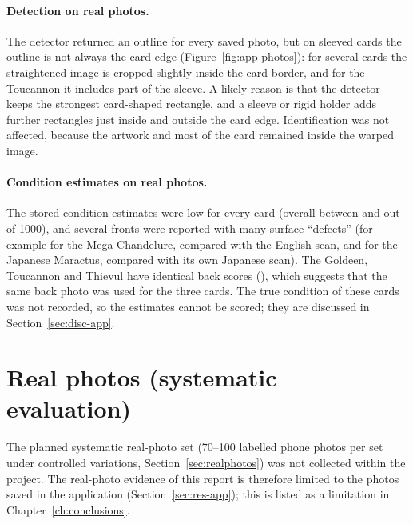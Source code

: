 \paragraph{Detection on real photos.} The detector returned an outline for every saved photo, but on sleeved cards the outline is not always the card edge (Figure~\ref{fig:app-photos}): for several cards the straightened image is cropped slightly inside the card border, and for the Toucannon it includes part of the sleeve. A likely reason is that the detector keeps the strongest card-shaped rectangle, and a sleeve or rigid holder adds further rectangles just inside and outside the card edge. Identification was not affected, because the artwork and most of the card remained inside the warped image.

\paragraph{Condition estimates on real photos.} The stored condition estimates were low for every card (overall between  and  out of 1000), and several fronts were reported with many surface ``defects'' (for example  for the Mega Chandelure, compared with the English scan, and  for the Japanese Maractus, compared with its own Japanese scan). The Goldeen, Toucannon and Thievul have identical back scores (), which suggests that the same back photo was used for the three cards. The true condition of these cards was not recorded, so the estimates cannot be scored; they are discussed in Section~\ref{sec:disc-app}.

\section{Real photos (systematic evaluation)}
\label{sec:res-real}

The planned systematic real-photo set (70--100 labelled phone photos per set under controlled variations, Section~\ref{sec:realphotos}) was not collected within the project. The real-photo evidence of this report is therefore limited to the  photos saved in the application (Section~\ref{sec:res-app}); this is listed as a limitation in Chapter~\ref{ch:conclusions}.
